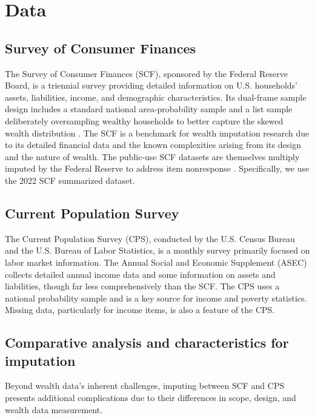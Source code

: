 \section{Data}\label{sec:data}

\subsection{Survey of Consumer Finances}

The Survey of Consumer Finances (SCF), sponsored by the Federal Reserve Board, is a triennial survey providing detailed information on U.S. households' assets, liabilities, income, and demographic characteristics. Its dual-frame sample design includes a standard national area-probability sample and a list sample deliberately oversampling wealthy households to better capture the skewed wealth distribution \citep{barcelo2006imputation}. The SCF is a benchmark for wealth imputation research due to its detailed financial data and the known complexities arising from its design and the nature of wealth. The public-use SCF datasets are themselves multiply imputed by the Federal Reserve to address item nonresponse \citep{barcelo2008impact}. Specifically, we use the 2022 SCF summarized dataset. 

\subsection{Current Population Survey}

The Current Population Survey (CPS), conducted by the U.S. Census Bureau and the U.S. Bureau of Labor Statistics, is a monthly survey primarily focused on labor market information. The Annual Social and Economic Supplement (ASEC) collects detailed annual income data and some information on assets and liabilities, though far less comprehensively than the SCF. The CPS uses a national probability sample and is a key source for income and poverty statistics. Missing data, particularly for income items, is also a feature of the CPS.

\subsection{Comparative analysis and characteristics for imputation}

Beyond wealth data's inherent challenges, imputing between SCF and CPS presents additional complications due to their differences in scope, design, and wealth data measurement.

